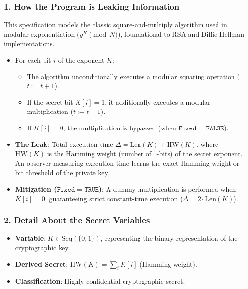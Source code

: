 \documentclass[a4paper,11pt]{article}
\begin{document}
\subsubsection{1. How the Program is Leaking Information}
This specification models the classic square-and-multiply algorithm used in modular exponentiation ($y^K \pmod N$), foundational to RSA and Diffie-Hellman implementations.
\begin{itemize}
    \item For each bit $i$ of the exponent $K$:
    \begin{itemize}
        \item The algorithm unconditionally executes a modular squaring operation ($t := t + 1$).
        \item If the secret bit $K[i] = 1$, it additionally executes a modular multiplication ($t := t + 1$).
        \item If $K[i] = 0$, the multiplication is bypassed (when $\texttt{Fixed = FALSE}$).
    \end{itemize}
    \item \textbf{The Leak}: Total execution time $\Delta = \text{Len}(K) + \text{HW}(K)$, where $\text{HW}(K)$ is the Hamming weight (number of 1-bits) of the secret exponent. An observer measuring execution time learns the exact Hamming weight or bit threshold of the private key.
    \item \textbf{Mitigation ($\texttt{Fixed = TRUE}$)}: A dummy multiplication is performed when $K[i] = 0$, guaranteeing strict constant-time execution ($\Delta = 2 \cdot \text{Len}(K)$).
\end{itemize}

\subsubsection{2. Detail About the Secret Variables}
\begin{itemize}
    \item \textbf{Variable}: $K \in \text{Seq}(\{0, 1\})$, representing the binary representation of the cryptographic key.
    \item \textbf{Derived Secret}: $\text{HW}(K) = \sum_{i} K[i]$ (Hamming weight).
    \item \textbf{Classification}: Highly confidential cryptographic secret.
\end{itemize}
\end{document}
